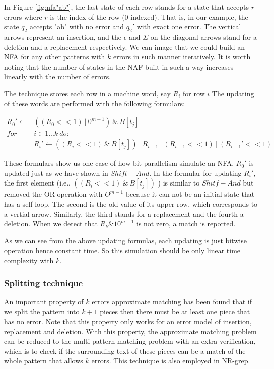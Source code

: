 In Figure \ref{fig:nfa"ab"}, the last state of each row stands for a state that accepts $r$ errors where $r$ is the index of the row (0-indexed). That is, in our example, the state $q_2$ accepts "ab" with no error and $q_2'$  with exact one error. The vertical arrows represent an insertion, and the $\epsilon$ and $\Sigma$ on the diagonal arrows stand for a deletion and a replacement respectively. We can image that we could build an NFA for any other patterns with $k$ errors in such manner iteratively. It is worth noting that the number of states in the NAF built in such a way increases linearly with the number of errors.

The technique stores each row in a machine word, say $R_i$ for row $i$ %
The updating of these words are performed with the following formulars: 

\begin{align*}
R_0' \leftarrow & ((R_0 << 1) \ |\ 0^{m-1}) \ \& \ B[t_j] \\
for \ &i \in 1...k \ do:  \\
	& R_i' \leftarrow ((R_i << 1) \ \& \ B[t_j] ) \ |\ R_{i-1} \ | \ (R_{i-1} << 1 ) \ |\ (R_{i-1}' << 1)
\end{align*}

These formulars show us one case of how bit-parallelism simulate an NFA. $R_0'$ is updated just as we have shown in $Shift-And$. In the formular for updating $R_i'$, the first element (i.e., $((R_i << 1) \ \& \ B[t_j] ) $ ) is similar to $Shitf-And$ but removed the OR operation with $O^{m-1}$ because it can not be an initial state that has a self-loop. The second is the old value of its upper row, which corresponds to a vertial arrow. Similarly, the third stands for a replacement and the fourth a deletion. When we detect that $R_k \& 10^{m-1}$ is not zero, a match is reported.  

As we can see from the above updating formulas, each updating is just bitwise operation hence constant time. So this simulation should be only linear time complexity with $k$.
 

\subsubsection{Splitting technique}
An important property of $k$ errors approximate matching has been found that if we split the pattern into $k+1$ pieces then there must be at least one piece that has no error\cite{wu1992}. Note that this property only works for an error model of insertion, replacement and deletion. With this property, the approximate matching problem can be reduced to the multi-pattern matching problem with an extra verification, which is to check if the surrounding text of these pieces can be a match of the whole pattern that allows $k$ errors. This technique is also employed in NR-grep. 
